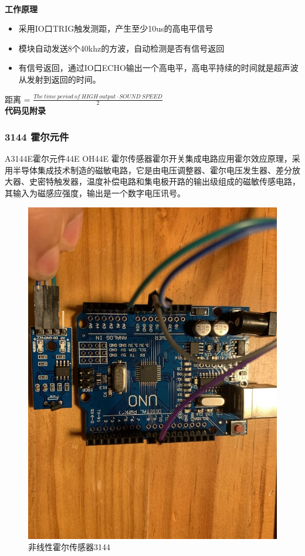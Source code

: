 \documentclass[conference]{IEEEtran}
\theoremstyle{break}
\begin{document}
\\
\textbf{工作原理}
\begin{itemize}
        \item 采用IO口TRIG触发测距，产生至少10us的高电平信号
        \item 模块自动发送8个40khz的方波，自动检测是否有信号返回
        \item 有信号返回，通过IO口ECHO输出一个高电平，高电平持续的时间就是超声波从发射到返回的时间。
\end{itemize}
距离 = $\frac{The\ time\ period\ of\ HIGH\ output \cdot SOUND\ SPEED}{2}$\\
\textbf{代码见附录}

\subsubsection{3144 霍尔元件}
A3144E霍尔元件44E OH44E 霍尔传感器霍尔开关集成电路应用霍尔效应原理，采用半导体集成技术制造的磁敏电路，它是由电压调整器、霍尔电压发生器、差分放大器、史密特触发器，温度补偿电路和集电极开路的输出级组成的磁敏传感电路，其输入为磁感应强度，输出是一个数字电压讯号。
\begin{figure}[htbp]
        \centerline{\includegraphics[scale=0.1]{非线性霍尔.JPG}}
        \caption{非线性霍尔传感器3144}
        \label{fig}
        \end{figure}
\end{document}
